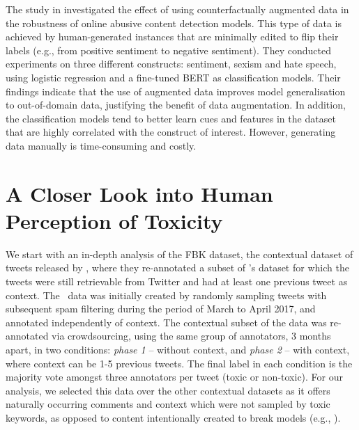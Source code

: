 \documentclass[acmsmall]{acmart}
\begin{document}
The study in \cite{counterfactual-data} investigated the effect of using counterfactually augmented data in the robustness of online abusive content detection models. This type of data is achieved by  human-generated instances that are minimally edited to flip their labels (e.g., from positive sentiment to negative sentiment). They conducted experiments on three different constructs: sentiment, sexism and hate speech, using logistic regression and a fine-tuned BERT as classification models. Their findings indicate that the use of augmented data  improves model generalisation to out-of-domain data, justifying the benefit of data augmentation. In addition, the classification models tend to better learn cues and features in the dataset that are highly correlated with the construct of interest. However, generating data manually is time-consuming and costly.

\section{A Closer Look into Human Perception of Toxicity \label{section:analysis}}
We start with an in-depth analysis of the FBK dataset, the contextual dataset of tweets released by \citet{FBK}, where they re-annotated a subset of \citet{Antigoni}'s dataset for which the tweets were still retrievable from Twitter and had at least one previous tweet as context. The~\citet{Antigoni} data was initially created by randomly sampling tweets with subsequent spam filtering during the period of March to April 2017, and annotated independently of context.
The contextual subset of the data was re-annotated via crowdsourcing, using the same group of annotators, 3 months apart, in two conditions: {\em phase 1} -- without context, and {\em phase 2} -- with context, where context can be 1-5 previous tweets. The final label in each condition is the  majority vote amongst three annotators per tweet  (toxic or non-toxic). For our analysis, we selected this data over the other contextual datasets as it offers naturally occurring comments and context which were not sampled by toxic keywords, as opposed to content intentionally created to break models (e.g., \cite{dialogue_safety,xu-etal-2021-bot}).  
\end{document}
